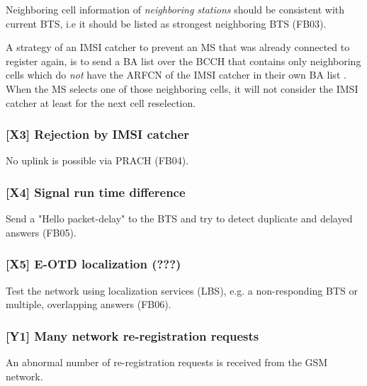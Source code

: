 \documentclass[a4paper,11pt,notitlepage,bigheadings,oneside]{scrartcl}
\begin{document}
Neighboring cell information of \emph{neighboring stations} should be
consistent with current BTS, i.e it should be listed as strongest neighboring
BTS (FB03).

A strategy of an IMSI catcher to prevent an MS that was already connected to
register again, is to send a BA list over the BCCH that contains only
neighboring cells which do \emph{not} have the ARFCN of the IMSI catcher in
their own BA list \cite[0027]{bott2000verfahren}. When the MS selects one of
those neighboring cells, it will not consider the IMSI catcher at least for the
next cell reselection.


\subsubsection{[X3] Rejection by IMSI catcher}

No uplink is possible via PRACH (FB04). 

\subsubsection{[X4] Signal run time difference}

Send a "Hello packet-delay" to the BTS and try to detect duplicate and delayed
answers (FB05).

\subsubsection{[X5] E-OTD localization (???)}

Test the network using localization services (LBS), e.g. a non-responding BTS
or multiple, overlapping answers (FB06).

\subsubsection{[Y1] Many network re-registration requests}

An abnormal number of re-registration requests is received from the GSM
network.
\end{document}
